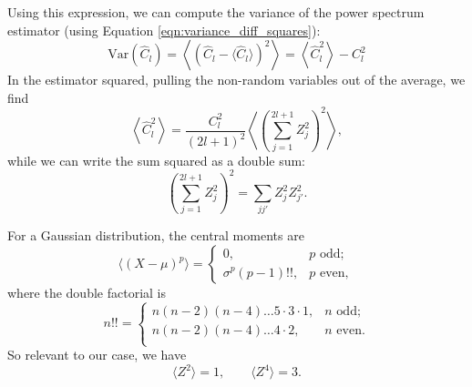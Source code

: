 Using this expression, we can compute the variance of the power spectrum estimator (using Equation \ref{eqn:variance_diff_squares}):
\begin{equation}
  \mathrm{Var}(\hat C_l) = \left\langle ( \hat C_l -\langle \hat C_l \rangle )^2 \right\rangle = \left\langle \hat C_l^2 \right\rangle - C_l^2
\end{equation}
In the estimator squared, pulling the non-random variables out of the average, we find
\begin{equation}
 \left\langle \hat C_l^2 \right\rangle =  \frac{C_l^2}{(2l+1)^2} \left\langle \left( \sum_{j=1}^{2l+1} Z_j^2 \right)^2 \right\rangle, \label{eqn:average_pCl_sq}
\end{equation}
while we can write the sum squared as a double sum:
\begin{equation}
\left( \sum_{j=1}^{2l+1} Z_j^2 \right)^2 =  \sum_{jj'}  Z_j^2 Z_{j'}^2.
\end{equation}

For a Gaussian distribution, the central moments are
\begin{equation}
  \langle (X - \mu)^p \rangle = \left\{
  \begin{array}{ll}
    0, & \mbox{$p$ odd}; \\
    \sigma^p (p-1)!!, & \mbox{$p$ even},
  \end{array}\right.
\end{equation}
where the double factorial is 
\begin{equation}
  n!! = \left\{ \begin{array}{ll}
    n(n-2)(n-4)\dots  5 \cdot 3 \cdot 1, &  \mbox{$n$ odd};\\
    n(n-2)(n-4)\dots  4 \cdot 2, &  \mbox{$n$ even}. \\
  \end{array} \right.
\end{equation}
So relevant to our case, we have
\begin{equation}
  \langle Z^2 \rangle = 1,  \qquad  \langle Z^4 \rangle = 3.
\end{equation}

